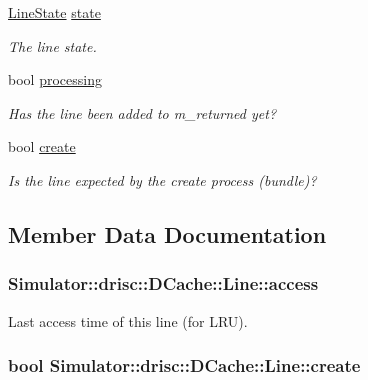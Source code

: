 \begin{DoxyCompactItemize}
\hyperlink{class_simulator_1_1drisc_1_1_d_cache_aab0700229ca4e63558dd73cb40ee0b71}{Line\+State} \hyperlink{struct_simulator_1_1drisc_1_1_d_cache_1_1_line_a3b56655fd184e5f02afddd91c9d6a378}{state}
\begin{DoxyCompactList}\small\item\em The line state. \end{DoxyCompactList}\item 
bool \hyperlink{struct_simulator_1_1drisc_1_1_d_cache_1_1_line_acd3ee0a50fbab9ff4aee82cb4388db8c}{processing}
\begin{DoxyCompactList}\small\item\em Has the line been added to m\+\_\+returned yet? \end{DoxyCompactList}\item 
bool \hyperlink{struct_simulator_1_1drisc_1_1_d_cache_1_1_line_af04922a255173d526651cf1b41c51f3f}{create}
\begin{DoxyCompactList}\small\item\em Is the line expected by the create process (bundle)? \end{DoxyCompactList}\end{DoxyCompactItemize}


\subsection{Member Data Documentation}
\hypertarget{struct_simulator_1_1drisc_1_1_d_cache_1_1_line_a31cbd7df0f708bf01b5bf1a8a878b48c}{
\subsubsection[{access}]{ Simulator\+::drisc\+::\+D\+Cache\+::\+Line\+::access}}\label{struct_simulator_1_1drisc_1_1_d_cache_1_1_line_a31cbd7df0f708bf01b5bf1a8a878b48c}


Last access time of this line (for L\+R\+U). 

\hypertarget{struct_simulator_1_1drisc_1_1_d_cache_1_1_line_af04922a255173d526651cf1b41c51f3f}{
\subsubsection[{create}]{\setlength{\rightskip}{0pt plus 5cm}bool Simulator\+::drisc\+::\+D\+Cache\+::\+Line\+::create}}\label{struct_simulator_1_1drisc_1_1_d_cache_1_1_line_af04922a255173d526651cf1b41c51f3f}


